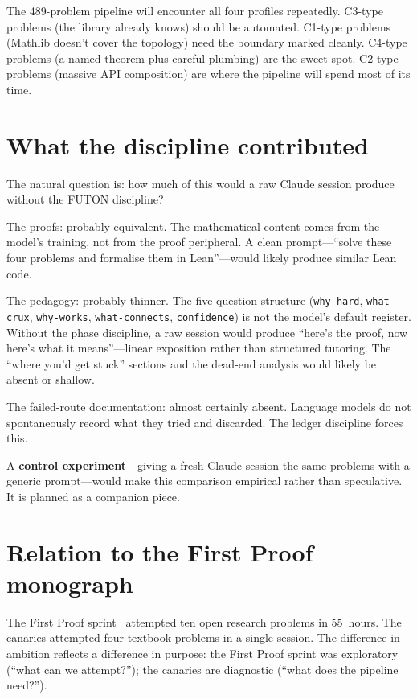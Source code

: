 \documentclass[12pt,oneside]{book}
\theoremstyle{plain}
\theoremstyle{definition}
\theoremstyle{remark}
\begin{document}
The 489-problem pipeline will encounter all four profiles repeatedly.
C3-type problems (the library already knows) should be automated.
C1-type problems (Mathlib doesn't cover the topology) need the
boundary marked cleanly. C4-type problems (a named theorem plus
careful plumbing) are the sweet spot. C2-type problems (massive API
composition) are where the pipeline will spend most of its time.

\section{What the discipline contributed}

The natural question is: how much of this would a raw Claude session
produce without the FUTON discipline?

The proofs: probably equivalent. The mathematical content comes from the
model's training, not from the proof peripheral. A clean prompt---``solve
these four problems and formalise them in Lean''---would likely produce
similar Lean code.

The pedagogy: probably thinner. The five-question structure
(\texttt{why-hard}, \texttt{what-crux}, \texttt{why-works},
\texttt{what-connects}, \texttt{confidence}) is not the model's default
register. Without the phase discipline, a raw session would produce
``here's the proof, now here's what it means''---linear exposition rather
than structured tutoring. The ``where you'd get stuck'' sections and the
dead-end analysis would likely be absent or shallow.

The failed-route documentation: almost certainly absent. Language models
do not spontaneously record what they tried and discarded. The ledger
discipline forces this.

A \textbf{control experiment}---giving a fresh Claude session the same
problems with a generic prompt---would make this comparison empirical
rather than speculative. It is planned as a companion piece.

\section{Relation to the First Proof monograph}

The First Proof sprint~\cite{firstproof} attempted ten open research
problems in 55~hours. The canaries attempted four textbook problems in a
single session. The difference in ambition reflects a difference in
purpose: the First Proof sprint was exploratory (``what can we
attempt?''); the canaries are diagnostic (``what does the pipeline
need?'').
\end{document}
